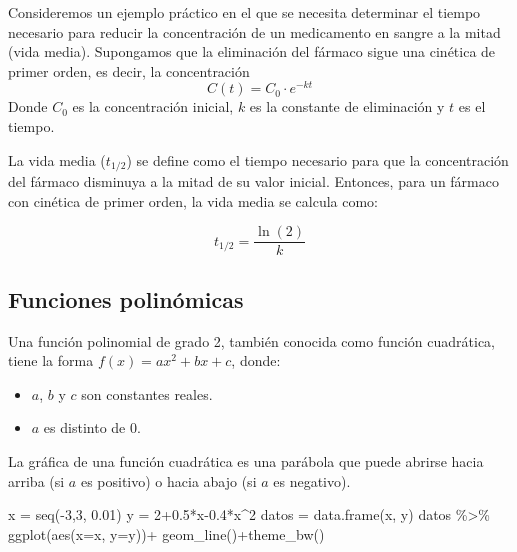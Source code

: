 \documentclass[
  spanish,
  letterpaper,
  DIV=11,
  numbers=noendperiod]{scrreprt}
\newenvironment{Shaded}{\begin{snugshade}}{\end{snugshade}}
\newcommand{\AttributeTok}[1]{\textcolor[rgb]{0.40,0.45,0.13}{#1}}
\newcommand{\DecValTok}[1]{\textcolor[rgb]{0.68,0.00,0.00}{#1}}
\newcommand{\FloatTok}[1]{\textcolor[rgb]{0.68,0.00,0.00}{#1}}
\newcommand{\FunctionTok}[1]{\textcolor[rgb]{0.28,0.35,0.67}{#1}}
\newcommand{\NormalTok}[1]{\textcolor[rgb]{0.00,0.23,0.31}{#1}}
\newcommand{\OtherTok}[1]{\textcolor[rgb]{0.00,0.23,0.31}{#1}}
\newcommand{\SpecialCharTok}[1]{\textcolor[rgb]{0.37,0.37,0.37}{#1}}
\providecommand{\tightlist}{%
  \setlength{\itemsep}{0pt}\setlength{\parskip}{0pt}}
\begin{document}
Consideremos un ejemplo práctico en el que se necesita determinar el
tiempo necesario para reducir la concentración de un medicamento en
sangre a la mitad (vida media). Supongamos que la eliminación del
fármaco sigue una cinética de primer orden, es decir, la concentración
\[C(t) = C_0 \cdot e^{-kt}\] Donde \(C_0\) es la concentración inicial,
\(k\) es la constante de eliminación y \(t\) es el tiempo.

La vida media (\(t_{1/2}\)) se define como el tiempo necesario para que
la concentración del fármaco disminuya a la mitad de su valor inicial.
Entonces, para un fármaco con cinética de primer orden, la vida media se
calcula como:

\[t_{1/2} = \frac{\ln(2)}{k}\]

\subsection{Funciones polinómicas}\label{funciones-polinuxf3micas}

Una función polinomial de grado 2, también conocida como función
cuadrática, tiene la forma \(f(x) = ax^2 + bx + c\), donde:

\begin{itemize}
\tightlist
\item
  \(a\), \(b\) y \(c\) son constantes reales.
\item
  \(a\) es distinto de 0.
\end{itemize}

La gráfica de una función cuadrática es una parábola que puede abrirse
hacia arriba (si \(a\) es positivo) o hacia abajo (si \(a\) es
negativo).

\begin{Shaded}
\begin{Highlighting}[]
\NormalTok{x }\OtherTok{=} \FunctionTok{seq}\NormalTok{(}\SpecialCharTok{{-}}\DecValTok{3}\NormalTok{,}\DecValTok{3}\NormalTok{, }\FloatTok{0.01}\NormalTok{)}
\NormalTok{y }\OtherTok{=} \DecValTok{2}\FloatTok{+0.5}\SpecialCharTok{*}\NormalTok{x}\FloatTok{{-}0.4}\SpecialCharTok{*}\NormalTok{x}\SpecialCharTok{\^{}}\DecValTok{2}
\NormalTok{datos }\OtherTok{=} \FunctionTok{data.frame}\NormalTok{(x, y)}
\NormalTok{datos }\SpecialCharTok{\%\textgreater{}\%} \FunctionTok{ggplot}\NormalTok{(}\FunctionTok{aes}\NormalTok{(}\AttributeTok{x=}\NormalTok{x, }\AttributeTok{y=}\NormalTok{y))}\SpecialCharTok{+}
  \FunctionTok{geom\_line}\NormalTok{()}\SpecialCharTok{+}\FunctionTok{theme\_bw}\NormalTok{()}
\end{Highlighting}
\end{Shaded}
\end{document}
